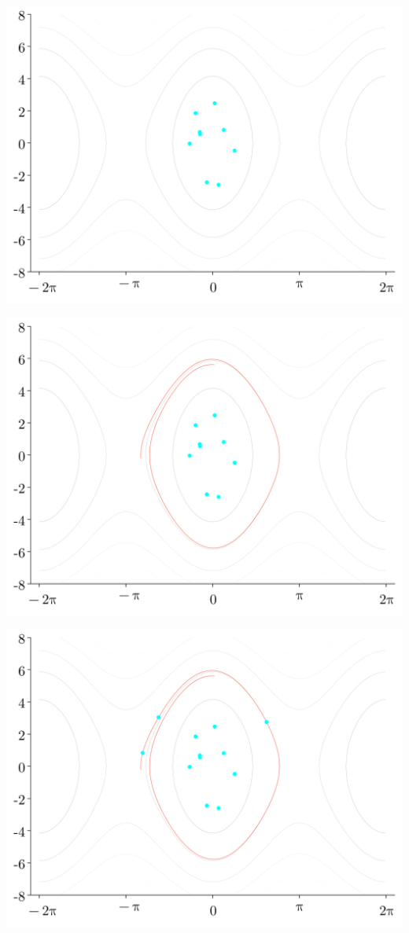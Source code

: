\documentclass[
]{report}
\begin{document}
\includegraphics{contents/assets/neuralpbc/009.svg}

\includegraphics{contents/assets/neuralpbc/010.svg}

\includegraphics{contents/assets/neuralpbc/011.svg}
\end{document}
